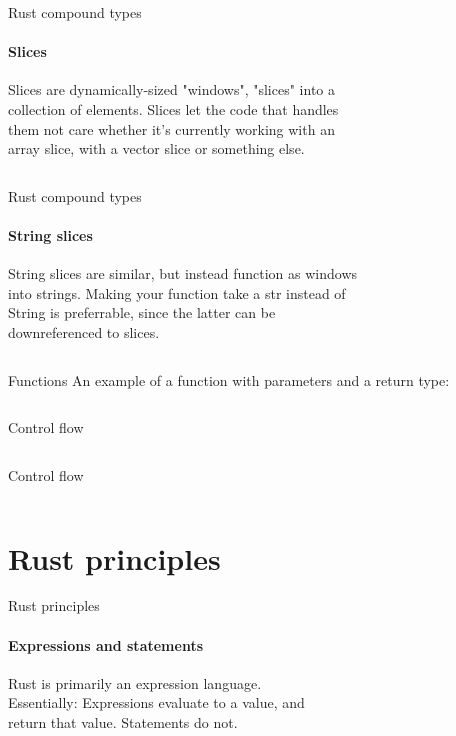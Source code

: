 \documentclass[usenames,dvipsnames,10pt,aspectratio=169]{beamer}
\begin{document}
\begin{frame}{Rust compound types}
\framesubtitle{Slices}
Slices are dynamically-sized "windows", "slices" into a\\
collection of elements. Slices let the code that handles\\
them not care whether it's currently working with an\\
array slice, with a vector slice or something else.
\vspace{0.2cm}
\inputminted[fontsize=\large]{rust}{code/slice.rs}
\vspace{0.5cm}
\end{frame}

\begin{frame}{Rust compound types}
\framesubtitle{String slices}
String slices are similar, but instead function as windows\\
into strings. Making your function take a \textcolor{ucuyellow}{str} instead of \\
\textcolor{ucuyellow}{String} is preferrable, since the latter can be\\
downreferenced to slices.
\vspace{0.2cm}
\inputminted[fontsize=\large]{rust}{code/str.rs}
\vspace{0.5cm}
\end{frame}

\begin{frame}{Functions}
\large
An example of a function with parameters and a return type:
\vspace{0.2cm}
\inputminted[fontsize=\large]{rust}{code/function.rs}
\vspace{0.5cm}
\end{frame}

\begin{frame}{Control flow}
\inputminted[fontsize=\Large]{rust}{code/control1.rs}
\vspace{0.7cm}
\end{frame}

\begin{frame}{Control flow}
\inputminted[fontsize=\Large]{rust}{code/control2.rs}
\vspace{0.7cm}
\end{frame}


\section{Rust principles}
\begin{frame}{Rust principles}
\framesubtitle{Expressions and statements}
\large{\textcolor{ucuyellow}{Rust is primarily an expression language.\\}}
\vspace{0.5cm}
Essentially: Expressions evaluate to a value, and\\
return that value. Statements do not.
\vspace{0.5cm}
\inputminted[fontsize=\large]{rust}{code/expression1.rs}
\end{frame}
\end{document}
